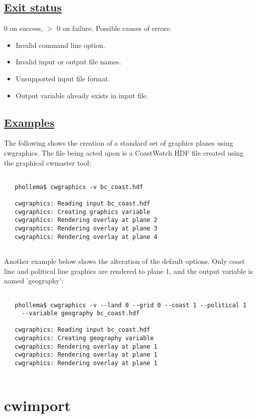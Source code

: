 \subsection*{\underline{Exit status}}


  0 on success, $>$ 0 on failure. Possible causes of errors:
\begin{itemize}
\item  Invalid command line option. 
\item  Invalid input or output file names. 
\item  Unsupported input file format. 
\item  Output variable already exists in input file. 

\end{itemize}
\subsection*{\underline{Examples}}


  The following shows the creation of a standard set of graphics planes using cwgraphics. The file being acted upon is a CoastWatch HDF file created using the graphical cwmaster tool:
\begin{verbatim}

   phollema$ cwgraphics -v bc_coast.hdf
 
   cwgraphics: Reading input bc_coast.hdf
   cwgraphics: Creating graphics variable
   cwgraphics: Rendering overlay at plane 2
   cwgraphics: Rendering overlay at plane 3
   cwgraphics: Rendering overlay at plane 4
 
\end{verbatim}


 Another example below shows the alteration of the default options. Only coast line and political line graphics are rendered to plane 1, and the output variable is named 'geography':
\begin{verbatim}

   phollema$ cwgraphics -v --land 0 --grid 0 --coast 1 --political 1 
     --variable geography bc_coast.hdf

   cwgraphics: Reading input bc_coast.hdf
   cwgraphics: Creating geography variable
   cwgraphics: Rendering overlay at plane 1
   cwgraphics: Rendering overlay at plane 1
   cwgraphics: Rendering overlay at plane 1
 
\end{verbatim}

\newpage
\section{cwimport} \hypertarget{cwimport}{}
